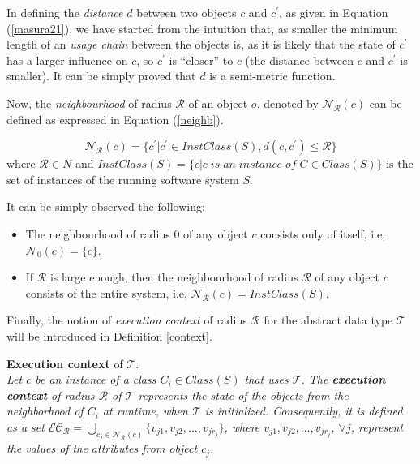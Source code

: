 In defining the \emph{distance} $d$ between two objects $c$ and $c^\prime$, as given in Equation (\ref{masura21}), we have started from the intuition that, as smaller the minimum length of an \emph{usage chain} between the objects is, as it is likely that the state of $c^\prime$ has a larger influence on $c$, so $c^\prime$ is ``closer'' to $c$ (the distance between $c$ and $c^\prime$ is smaller). It can be simply proved that $d$ is a semi-metric function.  

Now, the \emph{neighbourhood} of radius $\mathcal{R}$ of an object $o$, denoted by $\mathcal{N}_{\mathcal{R}}(c)$ can be defined as expressed in Equation (\ref{neighb}).

\begin{equation}\label{neighb}
\mathcal{N}_{\mathcal{R}}(c)= \{c^\prime | c^\prime \in InstClass(S), d(c, c^\prime) \leq \mathcal{R}  \}
\end{equation} 
where $\mathcal{R} \in N$ and $InstClass(S)=\{c| c \;is\;an\;instance\;of\;C \in Class(S)\}$ is the set of instances of the running software system $S$. 

It can be simply observed the following: 

\begin{itemize}

\item The neighbourhood of radius $0$ of any object $c$ consists only of itself, i.e, $\mathcal{N}_0(c)= \{c\}$.

\item If $\mathcal{R}$ is large enough, then the neighbourhood of radius $\mathcal{R}$ of any object $c$ consists of the entire system, i.e, $\mathcal{N}_{\mathcal{R}}(c)= InstClass(S)$.

\end{itemize}

Finally, the notion of \emph{execution context} of radius $\mathcal{R}$ for the abstract data type $\mathcal{T}$ will be introduced in Definition \ref{context}.     

\vspace{0.4cm}
\noindent
\begin{definition}\label{context}
{\bf Execution context} of $\mathcal{T}$. \\
{\it Let $c$ be an instance of a class $C_i \in Class(S)$ that uses $\mathcal{T}$. The {\bf execution context} of radius $\mathcal{R}$ of $\mathcal{T}$ represents the state of the objects from the neighborhood of $C_i$ at runtime, when $\mathcal{T}$ is initialized. Consequently, it is defined as a set $\mathcal{EC}_{\mathcal{R}}= \displaystyle\bigcup_{c_j \in \mathcal{N}_{\mathcal{R}}(c)}\{v_{j1}, v_{j2}, \dots , v_{jr_{j}} \}$, where $v_{j1}, v_{j2}, \dots , v_{jr_{j}}$, $\forall j$, represent the values of the attributes from object $c_j$.}  
\end{definition}


